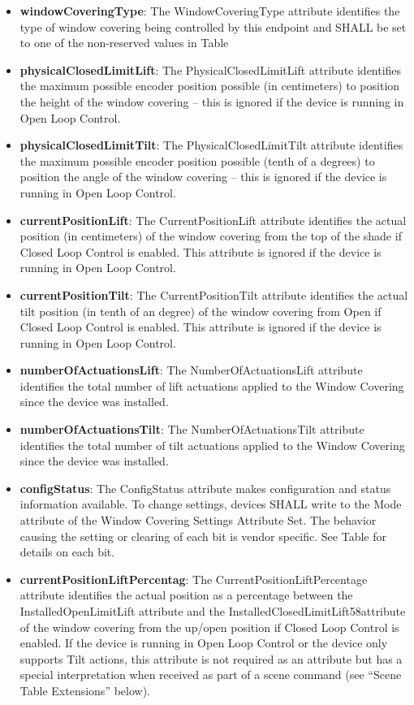 \begin{itemize}
\item \textbf{windowCoveringType}: The WindowCoveringType attribute identifies the type of window covering being controlled by this endpoint and SHALL be set to one of the non-reserved values in Table
\item \textbf{physicalClosedLimitLift}: The PhysicalClosedLimitLift attribute identifies the maximum possible encoder position possible (in centimeters) to position the height of the window covering – this is ignored if the device is running in Open Loop Control.
\item \textbf{physicalClosedLimitTilt}: The PhysicalClosedLimitTilt attribute identifies the maximum possible encoder position possible (tenth of a degrees) to position the angle of the window covering – this is ignored if the device is running in Open Loop Control.
\item \textbf{currentPositionLift}: The CurrentPositionLift attribute identifies the actual position (in centimeters) of the window covering from the top of the shade if Closed Loop Control is enabled. This attribute is ignored if the device is running in Open Loop Control.
\item \textbf{currentPositionTilt}: The CurrentPositionTilt attribute identifies the actual tilt position (in tenth of an degree) of the window covering from Open if Closed Loop Control is enabled. This attribute is ignored if the device is running in Open Loop Control.
\item \textbf{numberOfActuationsLift}: The NumberOfActuationsLift attribute identifies the total number of lift actuations applied to the Window Covering since the device was installed.
\item \textbf{numberOfActuationsTilt}: The NumberOfActuationsTilt attribute identifies the total number of tilt actuations applied to the Window Covering since the device was installed.
\item \textbf{configStatus}: The ConfigStatus attribute makes configuration and status information available. To change settings, devices SHALL write to the Mode attribute of the Window Covering Settings Attribute Set. The behavior causing the setting or clearing of each bit is vendor specific. See Table for details on each bit.
\item \textbf{currentPositionLiftPercentag}: The CurrentPositionLiftPercentage attribute identifies the actual position as a percentage between the InstalledOpenLimitLift attribute and the InstalledClosedLimitLift58attribute of the window covering from the up/open position if Closed Loop Control is enabled. If the device is running in Open Loop Control or the device only supports Tilt actions, this attribute is not required as an attribute but has a special interpretation when received as part of a scene command (see “Scene Table Extensions” below).

\end{itemize}
